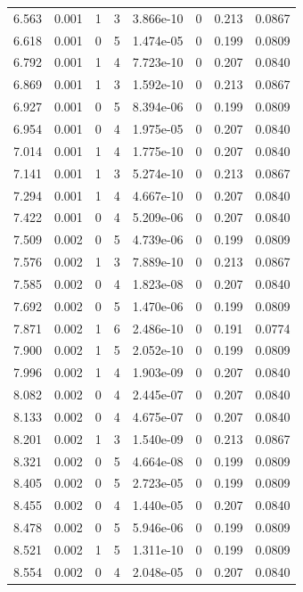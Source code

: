 \documentclass[preview]{standalone}
\begin{document}
{{{\begin{tabular}{L{1.2cm}C{1.2cm} C{0.3cm}C{0.5cm} C{1.4cm}C{1.4cm} C{1.4cm}C{1.4cm}}
  6.563  &  0.001  & 1     &  3 &  3.866e-10  & 0  & 0.213 &  0.0867   \\ 
  6.618  &  0.001  & 0     &  5 &  1.474e-05  & 0  & 0.199 &  0.0809   \\ 
  6.792  &  0.001  & 1     &  4 &  7.723e-10  & 0  & 0.207 &  0.0840   \\ 
  6.869  &  0.001  & 1     &  3 &  1.592e-10  & 0  & 0.213 &  0.0867   \\ 
  6.927  &  0.001  & 0     &  5 &  8.394e-06  & 0  & 0.199 &  0.0809   \\ 
  6.954  &  0.001  & 0     &  4 &  1.975e-05  & 0  & 0.207 &  0.0840   \\ 
  7.014  &  0.001  & 1     &  4 &  1.775e-10  & 0  & 0.207 &  0.0840   \\ 
  7.141  &  0.001  & 1     &  3 &  5.274e-10  & 0  & 0.213 &  0.0867   \\ 
  7.294  &  0.001  & 1     &  4 &  4.667e-10  & 0  & 0.207 &  0.0840   \\ 
  7.422  &  0.001  & 0     &  4 &  5.209e-06  & 0  & 0.207 &  0.0840   \\ 
  7.509  &  0.002  & 0     &  5 &  4.739e-06  & 0  & 0.199 &  0.0809   \\ 
  7.576  &  0.002  & 1     &  3 &  7.889e-10  & 0  & 0.213 &  0.0867   \\ 
  7.585  &  0.002  & 0     &  4 &  1.823e-08  & 0  & 0.207 &  0.0840   \\ 
  7.692  &  0.002  & 0     &  5 &  1.470e-06  & 0  & 0.199 &  0.0809   \\ 
  7.871  &  0.002  & 1     &  6 &  2.486e-10  & 0  & 0.191 &  0.0774   \\ 
  7.900  &  0.002  & 1     &  5 &  2.052e-10  & 0  & 0.199 &  0.0809   \\ 
  7.996  &  0.002  & 1     &  4 &  1.903e-09  & 0  & 0.207 &  0.0840   \\ 
  8.082  &  0.002  & 0     &  4 &  2.445e-07  & 0  & 0.207 &  0.0840   \\ 
  8.133  &  0.002  & 0     &  4 &  4.675e-07  & 0  & 0.207 &  0.0840   \\ 
  8.201  &  0.002  & 1     &  3 &  1.540e-09  & 0  & 0.213 &  0.0867   \\ 
  8.321  &  0.002  & 0     &  5 &  4.664e-08  & 0  & 0.199 &  0.0809   \\ 
  8.405  &  0.002  & 0     &  5 &  2.723e-05  & 0  & 0.199 &  0.0809   \\ 
  8.455  &  0.002  & 0     &  4 &  1.440e-05  & 0  & 0.207 &  0.0840   \\ 
  8.478  &  0.002  & 0     &  5 &  5.946e-06  & 0  & 0.199 &  0.0809   \\ 
  8.521  &  0.002  & 1     &  5 &  1.311e-10  & 0  & 0.199 &  0.0809   \\ 
  8.554  &  0.002  & 0     &  4 &  2.048e-05  & 0  & 0.207 &  0.0840   \\ 
\hline 
\end{tabular} 

}}}
\end{document}
